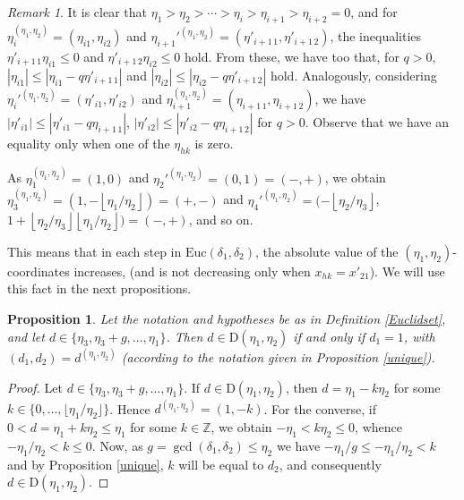 \documentclass[11pt]{amsart}
\newtheorem{proposition}[theorem]{Proposition}
\theoremstyle{remark}
\newtheorem{remark}[theorem]{Remark}
\newcommand{\peb}[1]{\left\lfloor {#1}\right\rfloor}
\begin{document}
\begin{remark}\label{nota}
It is clear that $\eta_1>\eta_2>\cdots >\eta_i>\eta_{i+1}>\eta_{i+2}=0$, and  for $\eta_i^{(\eta_1,\eta_2)}=(\eta_{i1},\eta_{i2})$ and $\eta_{i+1}'^{(\eta_1,\eta_2)}=(\eta'_{i+1\, 1},\eta'_{i+1\, 2})$, the inequalities $\eta'_{i+1\, 1}\eta_{i1}\le 0$ and $\eta'_{i+1\, 2}\eta_{i2}\le 0$ hold. From these, we have too that, for $q>0$, $|\eta_{i1}|\le |\eta_{i1}-q\eta'_{i+1\, 1}|$ and $|\eta_{i2}|\le |\eta_{i2}-q\eta'_{i+1\, 2}|$ hold. Analogously, considering  $\eta_i'^{(\eta_1,\eta_2)}=(\eta'_{i1},\eta'_{i2})$ and $\eta_{i+1}^{(\eta_1,\eta_2)}=(\eta_{i+1\, 1},\eta_{i+1\, 2})$, we have $|\eta'_{i1}|\le |\eta'_{i1}-q\eta_{i+1\, 1}|$, $|\eta'_{i2}|\le |\eta'_{i2}-q\eta_{i+1\, 2}|$ for $q>0$. Observe that we have an equality only when one of the $\eta_{hk}$ is zero.

As $\eta_1^{(\eta_1,\eta_2)}=(1,0)$ and $\eta_2'^{(\eta_1,\eta_2)}=(0,1)=(-,+)$, we obtain $\eta_3^{(\eta_1,\eta_2)}=(1,-\peb{\eta_1/\eta_2})=(+,-)$ and $\eta_4'^{(\eta_1,\eta_2)}=(-\peb{\eta_2/\eta_3}$, $1+\peb{\eta_2/\eta_3}\peb{\eta_1/\eta_2})=(-,+)$, and so on.

This means that in each step in $\mathrm{Euc}(\delta_1,\delta_2)$, the absolute value of the $(\eta_1,\eta_2)$-coordinates increases, (and is not decreasing only when $x_{hk}=x'_{21}$). We will use this fact in the next propositions.
 \end{remark}

\begin{proposition}\label{premain}
Let the notation and hypotheses be as in Definition \ref{Euclidset}, and let $d\in\{\eta_3,\eta_3+g,\ldots ,\eta_1\}$. Then $d\in \mathrm D(\eta_1,\eta_2)$ if and only if $d_1=1$, with $(d_1,d_2)=d^{(\eta_1,\eta_2)}$ (according to the notation given in Proposition \ref{unique}).
\end{proposition}

\begin{proof}
Let $d\in\{\eta_3, \eta_3+g,\ldots, \eta_1\}$. If $d\in \mathrm D(\eta_1,\eta_2)$, then $d=\eta_1-k\eta_2$ for some $k\in \{0,\ldots,\lfloor \eta_1/\eta_2\rfloor\}$. Hence $d^{(\eta_1,\eta_2)}=(1,-k)$. For the converse, if $0<d=\eta_1+k\eta_2\le \eta_1$ for some $k\in \mathbb Z$, we obtain $-\eta_1<k\eta_2\le 0$, whence $- \eta_1/\eta_2< k\le 0$. Now, as $g=\gcd(\delta_1,\delta_2)\leq \eta_2$ we have $-\eta_1/g\leq - \eta_1/\eta_2<k$  and by Proposition \ref{unique}, $k$ will be equal to $d_2$, and consequently $d\in \mathrm D(\eta_1,\eta_2)$.
\end{proof}
\end{document}
